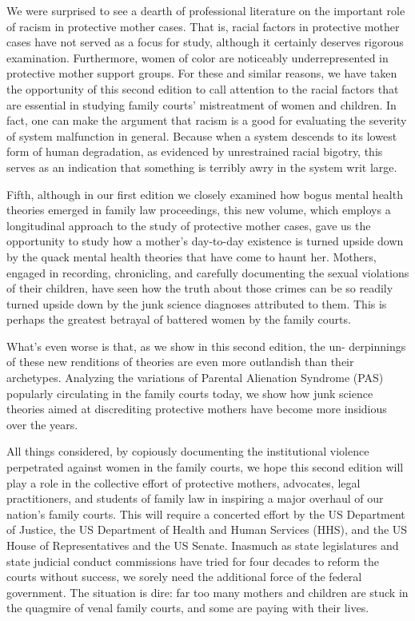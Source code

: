 We were surprised to see a dearth of professional literature on the 
important role of racism in protective mother cases. That is, racial factors
in protective mother cases have not served as a focus for study, 
although it certainly deserves rigorous examination. Furthermore, women
of color are noticeably underrepresented in protective mother support
groups. For these and similar reasons, we have taken the opportunity
of this second edition to call attention to the racial factors that are 
essential in studying family courts' mistreatment of women and children.
In fact, one can make the argument that racism is a good 
for evaluating the severity of system malfunction in general. Because
when a system descends to its lowest form of human degradation, as
evidenced by unrestrained racial bigotry, this serves as an indication
that something is terribly awry in the system writ large. \pfl{}

Fifth, although in our first edition we closely examined how bogus
mental health theories emerged in family law proceedings, this new 
volume, which employs a longitudinal approach to the study of protective
mother cases, gave us the opportunity to study how a mother's 
day-to-day existence is turned upside down by the quack mental health theories
that have come to haunt her. Mothers, engaged in recording, 
chronicling, and carefully documenting the sexual violations of their children,
have seen how the truth about those crimes can be so readily turned
upside down by the junk science diagnoses attributed to them. This is
perhaps the greatest betrayal of battered women by the family courts. \pfl{}

What's even worse is that, as we show in this second edition, the un-
derpinnings of these new renditions of  theories are
even more outlandish than their archetypes. Analyzing the variations of
Parental Alienation Syndrome (PAS) popularly circulating in the family
courts today, we show how junk science theories aimed at discrediting
protective mothers have become more insidious over the years. \pfl{}

All things considered, by copiously documenting the institutional 
violence perpetrated against women in the family courts, we hope this
second edition will play a role in the collective effort of protective
mothers, advocates, legal practitioners, and students of family law in 
inspiring a major overhaul of our nation’s family courts. This will require
a concerted effort by the US Department of Justice, the US Department
of Health and Human Services (HHS), and the US House of 
Representatives and the US Senate. 
Inasmuch as state legislatures and state judicial
conduct commissions have tried for four decades to reform the courts
without success, we sorely need the additional force of the federal 
government. The situation is dire: far too many mothers and children are
stuck in the quagmire of venal family courts, and some are paying with
their lives. \pfl{}

